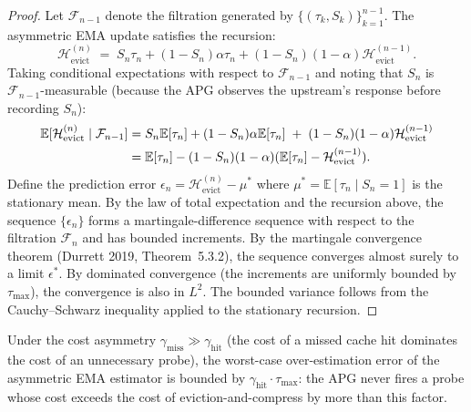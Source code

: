 \begin{proof}
Let $\mathcal{F}_{n-1}$ denote the filtration generated by
$\{(\tau_k, S_k)\}_{k=1}^{n-1}$. The asymmetric EMA update
satisfies the recursion:
\begin{equation}
\mathcal{H}_{\text{evict}}^{(n)}
\;=\;
S_n \tau_n + (1 - S_n) \alpha \tau_n + (1 - S_n)(1 - \alpha)
\mathcal{H}_{\text{evict}}^{(n-1)}.
\end{equation}
Taking conditional expectations with respect to $\mathcal{F}_{n-1}$
and noting that $S_n$ is $\mathcal{F}_{n-1}$-measurable (because the
APG observes the upstream's response before recording $S_n$):
\begin{align}
\mathbb{E}[\mathcal{H}_{\text{evict}}^{(n)} \mid \mathcal{F}_{n-1}]
&=
S_n \mathbb{E}[\tau_n] + (1 - S_n) \alpha \mathbb{E}[\tau_n]
\;+\; (1 - S_n)(1 - \alpha) \mathcal{H}_{\text{evict}}^{(n-1)} \notag\\
&=
\mathbb{E}[\tau_n] - (1 - S_n)(1 - \alpha)(\mathbb{E}[\tau_n]
- \mathcal{H}_{\text{evict}}^{(n-1)}).
\end{align}
Define the prediction error
$\epsilon_n = \mathcal{H}_{\text{evict}}^{(n)} - \mu^{*}$ where
$\mu^{*} = \mathbb{E}[\tau_n \mid S_n = 1]$ is the stationary mean. By
the law of total expectation and the recursion above, the sequence
$\{\epsilon_n\}$ forms a martingale-difference sequence with respect
to the filtration $\mathcal{F}_n$ and has bounded increments. By the
martingale convergence theorem (Durrett 2019, Theorem~5.3.2), the
sequence converges almost surely to a limit $\epsilon^{*}$. By
dominated convergence (the increments are uniformly bounded by
$\tau_{\max}$), the convergence is also in $L^2$. The bounded
variance follows from the Cauchy--Schwarz inequality applied to the
stationary recursion. \qedhere
\end{proof}

\begin{lemma}
\label{lem:risk-averse-bound}
Under the cost asymmetry $\gamma_{\text{miss}} \gg \gamma_{\text{hit}}$
(the cost of a missed cache hit dominates the cost of an unnecessary
probe), the worst-case over-estimation error of the asymmetric EMA
estimator is bounded by $\gamma_{\text{hit}} \cdot \tau_{\max}$:
the APG never fires a probe whose cost exceeds the cost of
eviction-and-compress by more than this factor.
\end{lemma}

